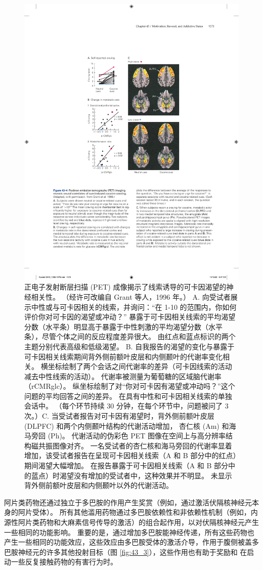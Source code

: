 \begin{figure}[htbp]
	\centering
	\includegraphics[width=0.6\linewidth]{chap43/fig_43_4}
	\caption{正电子发射断层扫描 (PET) 成像揭示了线索诱导的可卡因渴望的神经相关性。 （经许可改编自 Grant 等人，1996 年。） A. 向受试者展示中性或与可卡因相关的线索，并询问：“在 1-10 的范围内，你如何评价你对可卡因的渴望或冲动？” 暴露于可卡因相关线索的平均渴望分数（水平条）明显高于暴露于中性刺激的平均渴望分数（水平条），尽管个体之间的反应程度差异很大。 由红点和蓝点标识的两个主题分别代表高级和低级渴望。 B. 自我报告的渴望的变化与暴露于可卡因相关线索期间背外侧前额叶皮层和内侧颞叶的代谢率变化相关。 横坐标绘制了两个会话之间代谢率的差异（可卡因线索的活动减去中性线索的活动）。 代谢率被测量为葡萄糖的区域脑代谢率（rCMRglc）。 纵坐标绘制了对“你对可卡因有渴望或冲动吗？”这个问题的平均回答之间的差异。 在具有中性和可卡因相关线索的单独会话中。 （每个环节持续 30 分钟，在每个环节中，问题被问了 3 次。）C. 当受试者报告对可卡因有渴望时，背外侧前额叶皮层 (DLPFC) 和两个内侧颞叶结构的代谢活动增加， 杏仁核 (Am) 和海马旁回 (Ph)。 代谢活动的伪彩色 PET 图像在空间上与高分辨率结构磁共振图像对齐。 一名受试者的杏仁核和海马旁回的代谢率显着增加，该受试者报告在呈现可卡因相关线索（A 和 B 部分中的红点）期间渴望大幅增加。 在报告暴露于可卡因相关线索（A 和 B 部分中的蓝点）时渴望没有增加的受试者中，这种效果并不明显。 未显示背外侧前额叶皮层和内侧颞叶以外的代谢活动。}
	\label{fig:43_4}
\end{figure}

阿片类药物还通过独立于多巴胺的作用产生奖赏（例如，通过激活伏隔核神经元本身的阿片受体）。 所有其他滥用药物通过多巴胺依赖性和非依赖性机制（例如，内源性阿片类药物和大麻素信号传导的激活）的组合起作用，以对伏隔核神经元产生一些相同的功能影响。 重要的是，通过增加多巴胺能神经传递，所有这些药物也产生一些相同的功能效应，这些效应由多巴胺受体的激活介导，作用于腹侧被盖多巴胺神经元的许多其他投射目标（图 \ref{fig:43_3}），这些作用也有助于奖励和 在启动一些反复接触药物的有害行为时。

